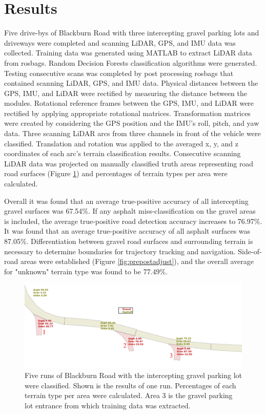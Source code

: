 \documentclass[journal,onecolumn]{IEEEtran}
\begin{document}
	
\section{Results}
	
	{Five drive-bys of Blackburn Road with three intercepting gravel parking lots and driveways were completed and scanning LiDAR, GPS, and IMU data was collected. Training data was generated using MATLAB to extract LiDAR data from rosbags. Random Decision Forests classification algorithms were generated. Testing consecutive scans was completed by post processing rosbags that contained scanning LiDAR, GPS, and IMU data. Physical distances between the GPS, IMU, and LiDAR were rectified by measuring the distance between the modules. Rotational reference frames between the GPS, IMU, and LiDAR were rectified by applying appropriate rotational matrices. Transformation matrices were created by considering the GPS position and the IMU's roll, pitch, and yaw data. Three scanning LiDAR arcs from three channels in front of the vehicle were classified. Translation and rotation was applied to the averaged x, y, and z coordinates of each arc's terrain classification results. Consecutive scanning LiDAR data was projected on manually classified truth areas representing road road surfaces (Figure \ref{fig:area_percentages}) and percentages of terrain types per area were calculated. }
		
	{Overall it was found that an average true-positive accuracy of all intercepting gravel surfaces was 67.54\%. If any asphalt miss-classification on the gravel areas is included, the average true-positive road detection accuracy increases to 76.97\%. It was found that an average true-positive accuracy of all asphalt surfaces was 87.05\%. Differentiation between gravel road surfaces and surrounding terrain is necessary to determine boundaries for trajectory tracking and navigation. Side-of-road areas were established (Figure \ref{fig:prepostadjust}), and the overall average for "unknown" terrain type was found to be 77.49\%.}

	\begin{figure}[H]
		\centering
		\includegraphics[width=0.9\linewidth]{figures/rm_db_4_percentages_big_anotated}
		\caption[Area Percentage Scores]{Five runs of Blackburn Road with the intercepting gravel parking lot were classified. Shown is the results of one run. Percentages of each terrain type per area were calculated. Area $3$ is the gravel parking lot entrance from which training data was extracted.}
		\label{fig:area_percentages}
	\end{figure}
\end{document}
